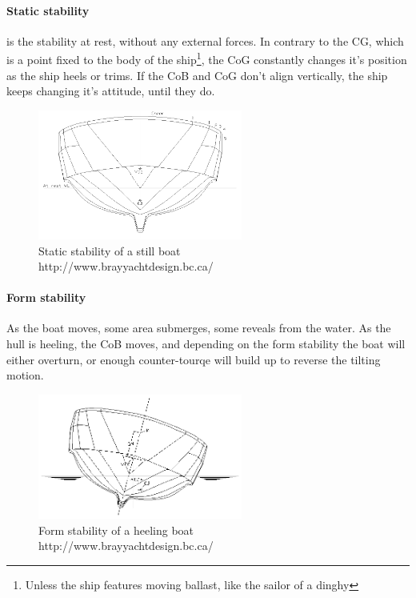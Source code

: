 \paragraph{Static stability} is the stability at rest, without any external forces. In contrary to the CG, which is a point fixed to the body of the ship\footnote{Unless the ship features moving ballast, like the sailor of a dinghy}, the CoG constantly changes it's position as the ship heels or trims. If the CoB and CoG don't align vertically, the ship keeps changing it's attitude, until they do.

\begin{figure}[H]
	\centering
	\includegraphics[width=0.6\textwidth]{img3/stability0}
	\caption{Static stability of a still boat\\http://www.brayyachtdesign.bc.ca/}
	\label{fig:stability0}
\end{figure}

\paragraph{Form stability} As the boat moves, some area submerges, some reveals from the water. As the hull is heeling, the CoB moves, and depending on the form stability the boat will either overturn, or enough counter-tourqe will build up to reverse the tilting motion.

\begin{figure}[H]
	\centering
	\includegraphics[width=0.6\textwidth]{img3/stability1}
	\caption{Form stability of a heeling boat\\http://www.brayyachtdesign.bc.ca/}
	\label{fig:stability1}
\end{figure}

